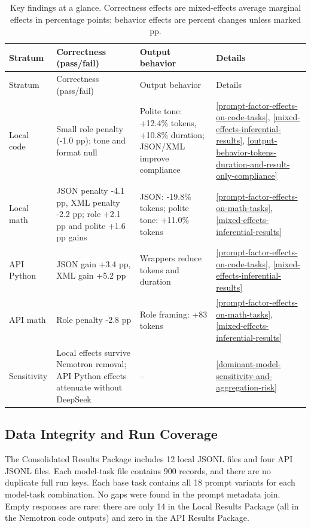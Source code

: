 \documentclass{llncs}
\begin{document}
\begin{longtable}[]{@{}
  >{\raggedright\arraybackslash}p{}
  >{\raggedright\arraybackslash}p{}
  >{\raggedright\arraybackslash}p{}
  >{\raggedright\arraybackslash}p{}@{}}
\caption{Key findings at a glance. Correctness effects are mixed-effects average marginal effects in percentage points; behavior effects are percent changes unless marked pp.}\label{tab:key-findings}\tabularnewline
\toprule\noalign{}
Stratum & Correctness (pass/fail) & Output behavior & Details \\
\midrule\noalign{}
\endfirsthead
\toprule\noalign{}
Stratum & Correctness (pass/fail) & Output behavior & Details \\
\midrule\noalign{}
\endhead
\bottomrule\noalign{}
\endlastfoot
Local code & Small role penalty (-1.0 pp); tone and format null & Polite tone: +12.4\% tokens, +10.8\% duration; JSON/XML improve compliance & \ref{prompt-factor-effects-on-code-tasks}, \ref{mixed-effects-inferential-results}, \ref{output-behavior-tokens-duration-and-result-only-compliance} \\
Local math & JSON penalty -4.1 pp, XML penalty -2.2 pp; role +2.1 pp and polite +1.6 pp gains & JSON: -19.8\% tokens; polite tone: +11.0\% tokens & \ref{prompt-factor-effects-on-math-tasks}, \ref{mixed-effects-inferential-results} \\
API Python & JSON gain +3.4 pp, XML gain +5.2 pp & Wrappers reduce tokens and duration & \ref{prompt-factor-effects-on-code-tasks}, \ref{mixed-effects-inferential-results} \\
API math & Role penalty -2.8 pp & Role framing: +83 tokens & \ref{prompt-factor-effects-on-math-tasks}, \ref{mixed-effects-inferential-results} \\
Sensitivity & Local effects survive Nemotron removal; API Python effects attenuate without DeepSeek & -- & \ref{dominant-model-sensitivity-and-aggregation-risk} \\
\end{longtable}

\subsection{Data Integrity and Run Coverage}\label{data-integrity-and-run-coverage}

The Consolidated Results Package includes 12 local JSONL files and four API JSONL files. Each model-task file contains 900 records, and there are no duplicate full run keys. Each base task contains all 18 prompt variants for each model-task combination. No gaps were found in the prompt metadata join. Empty responses are rare: there are only 14 in the Local Results Package (all in the Nemotron code outputs) and zero in the API Results Package.
\end{document}
